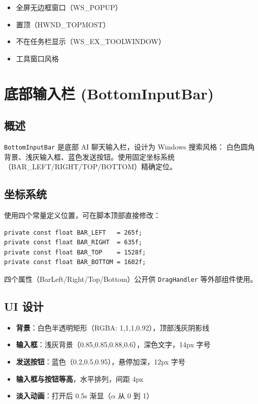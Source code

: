 \documentclass[12pt,a4paper]{ctexart}
\begin{document}
\begin{itemize}
    \item 全屏无边框窗口（WS\_POPUP）
    \item 置顶（HWND\_TOPMOST）
    \item 不在任务栏显示（WS\_EX\_TOOLWINDOW）
    \item 工具窗口风格
\end{itemize}

\section{底部输入栏 (BottomInputBar)}

\subsection{概述}

\texttt{BottomInputBar} 是底部 AI 聊天输入栏，设计为 Windows 搜索风格：
白色圆角背景、浅灰输入框、蓝色发送按钮。使用固定坐标系统
（BAR\_LEFT/RIGHT/TOP/BOTTOM）精确定位。

\subsection{坐标系统}

使用四个常量定义位置，可在脚本顶部直接修改：

\begin{lstlisting}[style=csharp,caption={BottomInputBar 坐标常量},label={lst:bar-coords}]
private const float BAR_LEFT   = 265f;
private const float BAR_RIGHT  = 635f;
private const float BAR_TOP    = 1528f;
private const float BAR_BOTTOM = 1602f;
\end{lstlisting}

四个属性（BarLeft/Right/Top/Bottom）公开供 \texttt{DragHandler}
等外部组件使用。

\subsection{UI 设计}

\begin{itemize}
    \item \textbf{背景}：白色半透明矩形（RGBA: 1,1,1,0.92），顶部浅灰阴影线
    \item \textbf{输入框}：浅灰背景（0.85,0.85,0.88,0.6），深色文字，14px 字号
    \item \textbf{发送按钮}：蓝色（0.2,0.5,0.95），悬停加深，12px 字号
    \item \textbf{输入框与按钮等高}，水平排列，间距 4px
    \item \textbf{淡入动画}：打开后 0.5s 渐显（$\alpha$ 从 0 到 1）
\end{itemize}
\end{document}
